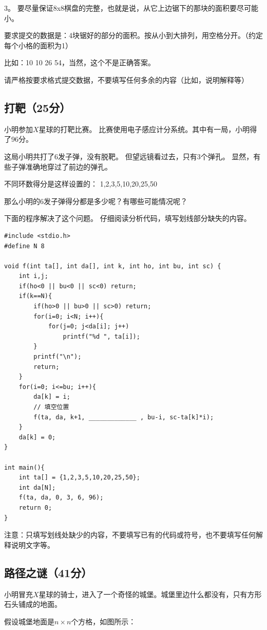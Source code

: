 \documentclass[a4paper, 12pt, twocolumn]{ctexart}
\begin{document}
	3。 要尽量保证8x8棋盘的完整，也就是说，从它上边锯下的那块的面积要尽可能小。
	
	要求提交的数据是：4块锯好的部分的面积。按从小到大排列，用空格分开。（约定每个小格的面积为1）
	
	比如：10 10 26 54，当然，这个不是正确答案。
	
	请严格按要求格式提交数据，不要填写任何多余的内容（比如，说明解释等）
	
	\subsection{打靶（25分）}
	
	小明参加$X$星球的打靶比赛。
	比赛使用电子感应计分系统。其中有一局，小明得了96分。
	
	这局小明共打了6发子弹，没有脱靶。
	但望远镜看过去，只有3个弹孔。
	显然，有些子弹准确地穿过了前边的弹孔。
	
	不同环数得分是这样设置的：
	1,2,3,5,10,20,25,50
	
	那么小明的6发子弹得分都是多少呢？有哪些可能情况呢？
	
	下面的程序解决了这个问题。
	仔细阅读分析代码，填写划线部分缺失的内容。
	
	\begin{lstlisting}
#include <stdio.h>
#define N 8
	
void f(int ta[], int da[], int k, int ho, int bu, int sc) {
	int i,j;
	if(ho<0 || bu<0 || sc<0) return;
	if(k==N){
		if(ho>0 || bu>0 || sc>0) return;
		for(i=0; i<N; i++){
			for(j=0; j<da[i]; j++) 
				printf("%d ", ta[i]);
		}
		printf("\n");
		return;
	}
	for(i=0; i<=bu; i++){
		da[k] = i;
		// 填空位置
		f(ta, da, k+1, _____________ , bu-i, sc-ta[k]*i);
	}	
	da[k] = 0;
}
	
int main(){
	int ta[] = {1,2,3,5,10,20,25,50};
	int da[N];
	f(ta, da, 0, 3, 6, 96);
	return 0;
}
	\end{lstlisting}
	
	
	注意：只填写划线处缺少的内容，不要填写已有的代码或符号，也不要填写任何解释说明文字等。
	
	
	\subsection{路径之谜（41分）}
	
	小明冒充$X$星球的骑士，进入了一个奇怪的城堡。城堡里边什么都没有，只有方形石头铺成的地面。
	
	假设城堡地面是$n\times n$个方格，如图所示：
	
\end{document}
